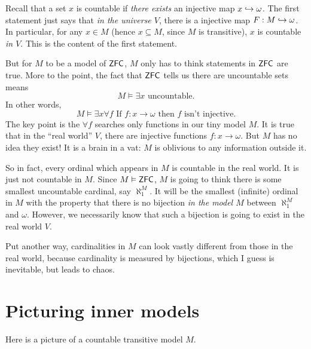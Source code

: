 Recall that a set $x$ is countable if
\emph{there exists} an injective map $x \hookrightarrow \omega$.
The first statement just says that \emph{in the universe $V$},
there is a injective map $F: M \hookrightarrow \omega$.
In particular, for any $x \in M$ (hence $x \subseteq M$, since $M$ is transitive),
$x$ is countable \emph{in $V$}.
This is the content of the first statement.

But for $M$ to be a model of $\mathsf{ZFC}$, $M$ only has to think statements in $\mathsf{ZFC}$ are true.
More to the point, the fact that $\mathsf{ZFC}$ tells us there are uncountable sets means
\[ M \vDash \text{$\exists x$ uncountable}. \]
In other words,
\[ M \vDash \exists x \forall f
	\text{ If $f : x \to \omega$ then $f$ isn't injective}. \]
The key point is the $\forall f$ searches only functions in our tiny model $M$.
It is true that in the ``real world'' $V$, there are injective functions $f : x \to \omega$.
But $M$ has no idea they exist!
It is a brain in a vat: $M$ is oblivious to any information outside it.

So in fact, every ordinal which appears in $M$ is countable in the real world.
It is just not countable in $M$.
Since $M \vDash \mathsf{ZFC}$, $M$ is going to think there is some smallest uncountable cardinal,
say $\aleph_1^M$.
It will be the smallest (infinite) ordinal in $M$
with the property that there is no bijection \emph{in the model $M$}
between $\aleph_1^M$ and $\omega$.
However, we necessarily know that such a bijection is going to exist in the real world $V$.

Put another way, cardinalities in $M$ can look vastly different from those in the real world,
because cardinality is measured by bijections, which I guess is inevitable, but leads to chaos.

\section{Picturing inner models}
Here is a picture of a countable transitive model $M$.

